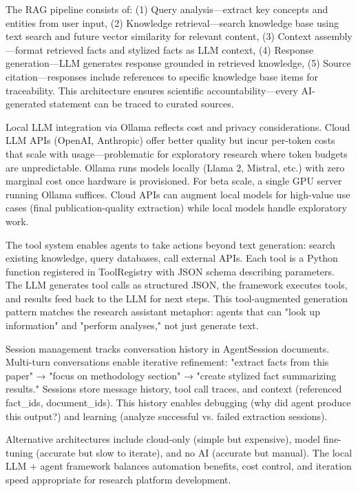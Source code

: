 \documentclass[12pt,a4paper]{article}
\begin{document}
The RAG pipeline consists of: (1) Query analysis—extract key concepts and entities from user input, (2) Knowledge retrieval—search knowledge base using text search and future vector similarity for relevant content, (3) Context assembly—format retrieved facts and stylized facts as LLM context, (4) Response generation—LLM generates response grounded in retrieved knowledge, (5) Source citation—responses include references to specific knowledge base items for traceability. This architecture ensures scientific accountability—every AI-generated statement can be traced to curated sources.

Local LLM integration via Ollama reflects cost and privacy considerations. Cloud LLM APIs (OpenAI, Anthropic) offer better quality but incur per-token costs that scale with usage—problematic for exploratory research where token budgets are unpredictable. Ollama runs models locally (Llama 2, Mistral, etc.) with zero marginal cost once hardware is provisioned. For beta scale, a single GPU server running Ollama suffices. Cloud APIs can augment local models for high-value use cases (final publication-quality extraction) while local models handle exploratory work.

The tool system enables agents to take actions beyond text generation: search existing knowledge, query databases, call external APIs. Each tool is a Python function registered in ToolRegistry with JSON schema describing parameters. The LLM generates tool calls as structured JSON, the framework executes tools, and results feed back to the LLM for next steps. This tool-augmented generation pattern matches the research assistant metaphor: agents that can "look up information" and "perform analyses," not just generate text.

Session management tracks conversation history in AgentSession documents. Multi-turn conversations enable iterative refinement: "extract facts from this paper" → "focus on methodology section" → "create stylized fact summarizing results." Sessions store message history, tool call traces, and context (referenced fact\_ids, document\_ids). This history enables debugging (why did agent produce this output?) and learning (analyze successful vs. failed extraction sessions).

Alternative architectures include cloud-only (simple but expensive), model fine-tuning (accurate but slow to iterate), and no AI (accurate but manual). The local LLM + agent framework balances automation benefits, cost control, and iteration speed appropriate for research platform development.
\end{document}
